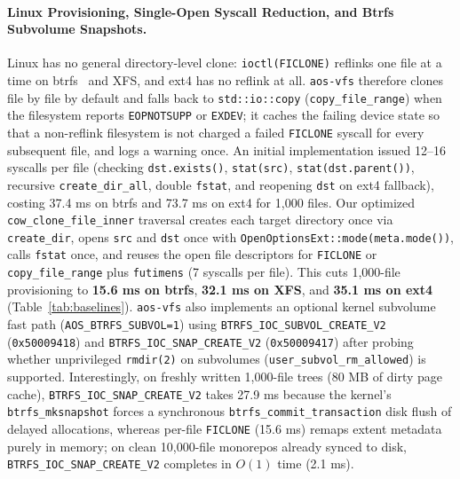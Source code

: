 \documentclass[acmsmall,screen,review]{acmart}
\begin{document}
\paragraph{Linux Provisioning, Single-Open Syscall Reduction, and Btrfs Subvolume Snapshots.} Linux has no general directory-level clone: \texttt{ioctl(FICLONE)} reflinks one file at a time on btrfs~\cite{rodeh2013btrfs} and XFS, and ext4 has no reflink at all. \texttt{aos-vfs} therefore clones file by file by default and falls back to \texttt{std::io::copy} (\texttt{copy\_file\_range}) when the filesystem reports \texttt{EOPNOTSUPP} or \texttt{EXDEV}; it caches the failing device state so that a non-reflink filesystem is not charged a failed \texttt{FICLONE} syscall for every subsequent file, and logs a warning once. An initial implementation issued 12--16 syscalls per file (checking \texttt{dst.exists()}, \texttt{stat(src)}, \texttt{stat(dst.parent())}, recursive \texttt{create\_dir\_all}, double \texttt{fstat}, and reopening \texttt{dst} on ext4 fallback), costing 37.4 ms on btrfs and 73.7 ms on ext4 for 1,000 files. Our optimized \texttt{cow\_clone\_file\_inner} traversal creates each target directory once via \texttt{create\_dir}, opens \texttt{src} and \texttt{dst} once with \texttt{OpenOptionsExt::mode(meta.mode())}, calls \texttt{fstat} once, and reuses the open file descriptors for \texttt{FICLONE} or \texttt{copy\_file\_range} plus \texttt{futimens} (7 syscalls per file). This cuts 1,000-file provisioning to \textbf{15.6 ms on btrfs}, \textbf{32.1 ms on XFS}, and \textbf{35.1 ms on ext4} (Table~\ref{tab:baselines}). \texttt{aos-vfs} also implements an optional kernel subvolume fast path (\texttt{AOS\_BTRFS\_SUBVOL=1}) using \texttt{BTRFS\_IOC\_SUBVOL\_CREATE\_V2} (\texttt{0x50009418}) and \texttt{BTRFS\_IOC\_SNAP\_CREATE\_V2} (\texttt{0x50009417}) after probing whether unprivileged \texttt{rmdir(2)} on subvolumes (\texttt{user\_subvol\_rm\_allowed}) is supported. Interestingly, on freshly written 1,000-file trees (80 MB of dirty page cache), \texttt{BTRFS\_IOC\_SNAP\_CREATE\_V2} takes 27.9 ms because the kernel's \texttt{btrfs\_mksnapshot} forces a synchronous \texttt{btrfs\_commit\_transaction} disk flush of delayed allocations, whereas per-file \texttt{FICLONE} (15.6 ms) remaps extent metadata purely in memory; on clean 10,000-file monorepos already synced to disk, \texttt{BTRFS\_IOC\_SNAP\_CREATE\_V2} completes in $O(1)$ time (2.1 ms).
\end{document}
